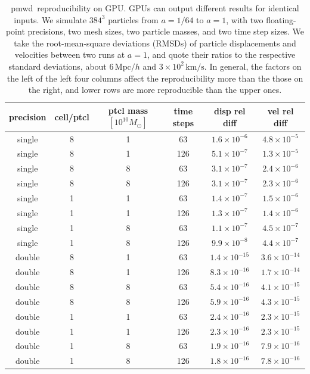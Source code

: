 \documentclass[modern, trackchanges, dvipsnames]{aastex631}
\newcommand{\pmwd}{{\usefont{T1}{nova}{m}{sl}pmwd}}
\newcommand{\Mpc}{\mathrm{Mpc}}
\begin{document}
\begin{table}[t]
\centering
\caption{\pmwd\ reproducibility on GPU.
GPUs can output different results for identical inputs.
We simulate $384^3$ particles from $a=1/64$ to $a=1$, with two
floating-point precisions, two mesh sizes, two particle masses, and two
time step sizes.
We take the root-mean-square deviations (RMSDs) of particle
displacements and velocities between two runs at $a=1$, and quote their
ratios to the respective standard deviations, about $6 \, \Mpc / h$ and
$3\times10^2 \, \mathrm{km} / \mathrm{s}$.
In general, the factors on the left of the left four columns affect the
reproducibility more than the those on the right, and lower rows are
more reproducible than the upper ones.
}
\label{tab:rep}
\begin{tabular}{cccccc}
  \toprule
  precision & cell/ptcl & ptcl mass $[10^{10} M_\odot]$ & time steps
    & disp rel diff & vel rel diff \\
  \midrule
  single & 8 & 1 &  63 & $1.6\times10^{-6}$  & $4.8\times10^{-5}$  \\
  single & 8 & 1 & 126 & $5.1\times10^{-7}$  & $1.3\times10^{-5}$  \\
  single & 8 & 8 &  63 & $3.1\times10^{-7}$  & $2.4\times10^{-6}$  \\
  single & 8 & 8 & 126 & $3.1\times10^{-7}$  & $2.3\times10^{-6}$  \\
  single & 1 & 1 &  63 & $1.4\times10^{-7}$  & $1.5\times10^{-6}$  \\
  single & 1 & 1 & 126 & $1.3\times10^{-7}$  & $1.4\times10^{-6}$  \\
  single & 1 & 8 &  63 & $1.1\times10^{-7}$  & $4.5\times10^{-7}$  \\
  single & 1 & 8 & 126 & $9.9\times10^{-8}$  & $4.4\times10^{-7}$  \\
  double & 8 & 1 &  63 & $1.4\times10^{-15}$ & $3.6\times10^{-14}$ \\
  double & 8 & 1 & 126 & $8.3\times10^{-16}$ & $1.7\times10^{-14}$ \\
  double & 8 & 8 &  63 & $5.4\times10^{-16}$ & $4.1\times10^{-15}$ \\
  double & 8 & 8 & 126 & $5.9\times10^{-16}$ & $4.3\times10^{-15}$ \\
  double & 1 & 1 &  63 & $2.4\times10^{-16}$ & $2.3\times10^{-15}$ \\
  double & 1 & 1 & 126 & $2.3\times10^{-16}$ & $2.3\times10^{-15}$ \\
  double & 1 & 8 &  63 & $1.9\times10^{-16}$ & $7.9\times10^{-16}$ \\
  double & 1 & 8 & 126 & $1.8\times10^{-16}$ & $7.8\times10^{-16}$ \\
  \bottomrule
\end{tabular}
\end{table}
\end{document}
